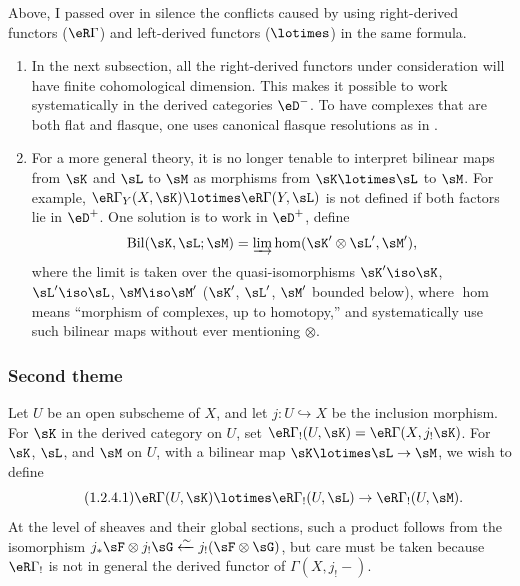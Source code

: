 \subsubsection{}\label{IV:1-2-3}

Above, I passed over in silence the conflicts caused by using right-derived
functors ($\eR\Gamma$) and left-derived functors ($\lotimes$) in the same
formula.
\begin{enumerate}[\indent a)]
  \item In the next subsection, all the right-derived functors under
    consideration will have finite cohomological dimension. This makes it
    possible to work systematically in the derived categories $\eD^-$. To
    have complexes that are both flat and flasque, one uses canonical
    flasque resolutions as in \cite[XVII]{sga4}.
  \item For a more general theory, it is no longer tenable to interpret bilinear maps
    from $\sK$ and $\sL$ to $\sM$ as morphisms from
    $\sK\lotimes\sL$ to $\sM$. For example,
    $\eR\Gamma_Y(X,\sK)\lotimes\eR\Gamma(Y,\sL)$ is not defined if both
    factors lie in $\eD^+$. One solution is to work in $\eD^+$, define
    \[
      \operatorname{Bil}(\sK,\sL;\sM) = \varinjlim \hom(\sK'\otimes\sL',\sM') \text{,}
    \]
    where the limit is taken over the quasi-isomorphisms $\sK'\iso \sK$,
    $\sL'\iso \sL$, $\sM\iso \sM'$ ($\sK'$, $\sL'$, $\sM'$ bounded
    below), where $\hom$ means ``morphism of complexes, up to homotopy,'' and
    systematically use such bilinear maps without ever mentioning
    $\otimes$.
\end{enumerate}





\subsubsection{Second theme}\label{IV:1-2-4}

Let $U$ be an open subscheme of $X$, and let $j:U\hookrightarrow X$ be the
inclusion morphism. For $\sK$ in the derived category on $U$, set
$\eR\Gamma_!(U,\sK)=\eR\Gamma(X,j_!\sK)$. For $\sK$, $\sL$, and $\sM$ on
$U$, with a bilinear map $\sK\lotimes\sL\to\sM$, we wish to define
\begin{equation*}\tag{1.2.4.1}\label{IV:eq:1-2-4-1}
  \eR\Gamma(U,\sK)\lotimes\eR\Gamma_!(U,\sL)\to\eR\Gamma_!(U,\sM) \text{.}
\end{equation*}
At the level of sheaves and their global sections, such a product follows
from the isomorphism
$j_*\sF\otimes j_!\sG\xleftarrow\sim j_!(\sF\otimes \sG)$, but care must be
taken because $\eR\Gamma_!$ is not in general the derived functor of
$\Gamma(X,j_!-)$.

